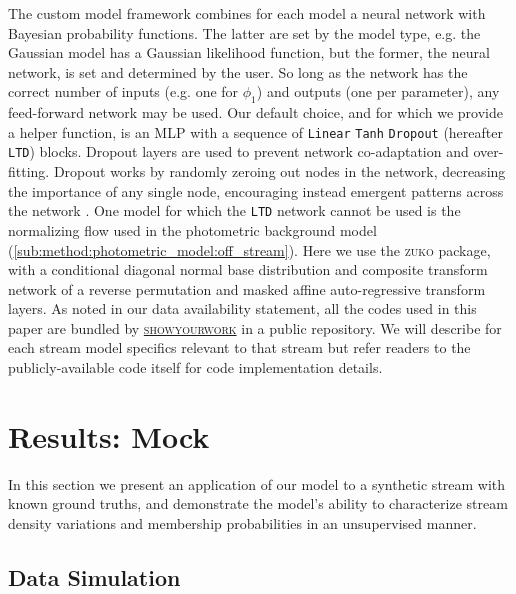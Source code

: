 \documentclass[twocolumn]{aastex631}
\newcommand{\code}[1]{\textsc{#1}}
\newcommand{\package}[1]{\code{#1}}
\begin{document}
        The custom model framework combines for each model a neural network with
        Bayesian probability functions. The latter are set by the model type,
        e.g. the Gaussian model has a Gaussian likelihood function, but the
        former, the neural network, is set and determined by the user. So long
        as the network has the correct number of inputs (e.g. one for $\phi_1$)
        and outputs (one per parameter), any feed-forward network may be used.
        Our default choice, and for which we provide a helper function, is an
        MLP with a sequence of \texttt{Linear} \!\!\textrightarrow \texttt{Tanh}
        \!\!\textrightarrow \texttt{Dropout} (hereafter \texttt{LTD}) blocks.
        Dropout layers are used to prevent network co-adaptation and
        over-fitting. Dropout works by randomly zeroing out nodes in the
        network, decreasing the importance of any single node, encouraging
        instead emergent patterns across the network \citep{GalGhahramani2015}.
        One model for which the \texttt{LTD} network cannot be used is the
        normalizing flow used in the photometric background model
        (\autoref{sub:method:photometric_model:off_stream}). Here we use the
        \package{zuko} package, with a conditional diagonal normal base
        distribution and composite transform network of a reverse permutation
        and masked affine auto-regressive transform layers. As noted in our data
        availability statement, all the codes used in this paper are bundled by
        \href{https://github.com/showyourwork/showyourwork}{\package{showyourwork}}
        in a public repository. We will describe for each stream model specifics
        relevant to that stream but refer readers to the publicly-available code
        itself for code implementation details.
        

\section{Results: Mock} \label{sec:results_mock}

    In this section we present an application of our model to a synthetic stream
    with known ground truths, and demonstrate the model's ability to
    characterize stream density variations and membership probabilities in an
    unsupervised manner.

    \subsection{Data Simulation} \label{sub:results_mock:data}
\end{document}

